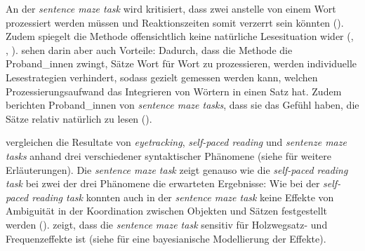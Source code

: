 \begin{sloppypar}
An der \textit{sentence maze task} wird kritisiert, dass zwei anstelle von einem Wort prozessiert werden müssen und Reaktionszeiten somit verzerrt sein könnten (\cite[353]{Forster.2010}). Zudem spiegelt die Methode offensichtlich keine natürliche Lesesituation wider (\cite[350]{Forster.2009}, \cite[164]{Forster.2010}, \cite[107]{Witzel.2012}). \textcite[108--109]{Witzel.2012} sehen darin aber auch Vorteile: Dadurch, dass die Methode die Proband\_innen zwingt, Sätze Wort für Wort zu prozessieren, werden individuelle Lesestrategien verhindert, sodass gezielt gemessen werden kann, welchen Prozessierungsaufwand das Integrieren von Wörtern in einen Satz hat. Zudem berichten Proband\_innen von \textit{sentence maze tasks}, dass sie das Gefühl haben, die Sätze relativ natürlich zu lesen (\cite[164]{Forster.2009}).
\end{sloppypar}

\textcite{Witzel.2012} vergleichen die Resultate von \textit{eyetracking}, \textit{self-paced reading} und \textit{sentenze maze tasks} anhand drei verschiedener syntaktischer Phänomene (siehe  für weitere Erläuterungen). Die \textit{sentence maze task} zeigt genauso wie die \textit{self-paced reading task} bei zwei der drei Phänomene die erwarteten Ergebnisse: Wie bei der \textit{self-paced reading task} konnten auch in der \textit{sentence maze task} keine Effekte von Ambiguität in der Koordination zwischen Objekten und Sätzen festgestellt werden (\cite[121--124]{Witzel.2012}). \textcite[167--170]{Forster.2010} zeigt, dass die \textit{sentence maze task} sensitiv für Holzwegsatz- und Frequenzeffekte ist (siehe  für eine bayesianische Modellierung der Effekte).

